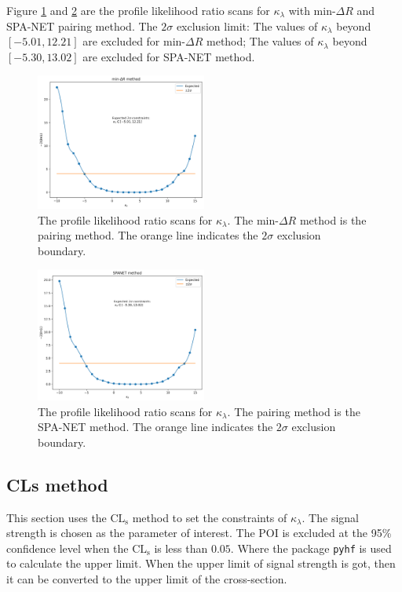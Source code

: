\documentclass[12pt]{article}
\begin{document}
		Figure \ref{fig:log_likelihood_ratio_kappa_min_dR} and \ref{fig:log_likelihood_ratio_kappa_SPANET} are the profile likelihood ratio scans for $\kappa_\lambda$ with $\text{min-}\Delta R$ and SPA-NET pairing method. The $2\sigma$ exclusion limit: The values of $\kappa_\lambda$ beyond $\left[ -5.01,12.21 \right]$ are excluded for $\text{min-}\Delta R$ method; The values of $\kappa_\lambda$ beyond $\left[ -5.30, 13.02 \right]$ are excluded for SPA-NET method.
		\begin{figure}[htpb]
			\centering
			\includegraphics[width=0.5\textwidth]{log_likelihood_ratio_kappa_min_dR.png}
			\caption{The profile likelihood ratio scans for $\kappa_\lambda$. The $\text{min-}\Delta R$ method is the pairing method. The orange line indicates the $2\sigma$ exclusion boundary.}
			\label{fig:log_likelihood_ratio_kappa_min_dR}
		\end{figure}
		\begin{figure}[htpb]
			\centering
			\includegraphics[width=0.5\textwidth]{log_likelihood_ratio_kappa_SPANET.png}
			\caption{The profile likelihood ratio scans for $\kappa_\lambda$. The pairing method is the SPA-NET method. The orange line indicates the $2\sigma$ exclusion boundary.}
			\label{fig:log_likelihood_ratio_kappa_SPANET}
		\end{figure}
	\subsection{CLs method}%
	\label{sub:cls_method}
		This section uses the $\text{CL}_{\text{s}}$ method to set the constraints of $\kappa_\lambda$. The signal strength is chosen as the parameter of interest. The POI is excluded at the 95\% confidence level when the $\text{CL}_{\text{s}}$ is less than $0.05$. Where the package \verb+pyhf+ is used to calculate the upper limit. When the upper limit of signal strength is got, then it can be converted to the upper limit of the cross-section.
\end{document}
